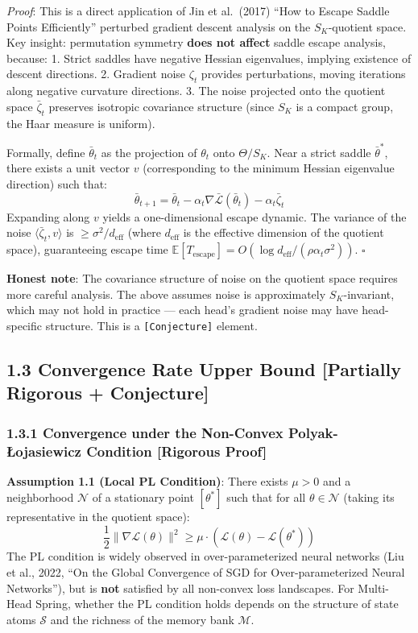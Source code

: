 \documentclass[
  12pt,
]{article}
\begin{document}
\emph{Proof}: This is a direct application of Jin et al.~(2017) ``How to Escape Saddle Points Efficiently'' perturbed gradient descent analysis on the $S_K$-quotient space. Key insight: permutation symmetry \textbf{does not affect} saddle escape analysis, because:
1. Strict saddles have negative Hessian eigenvalues, implying existence of descent directions.
2. Gradient noise $\zeta_t$ provides perturbations, moving iterations along negative curvature directions.
3. The noise projected onto the quotient space $\bar{\zeta}_t$ preserves isotropic covariance structure (since $S_K$ is a compact group, the Haar measure is uniform).

Formally, define $\bar{\theta}_t$ as the projection of $\theta_t$ onto $\Theta/S_K$. Near a strict saddle $\bar{\theta}^*$, there exists a unit vector $v$ (corresponding to the minimum Hessian eigenvalue direction) such that:
\[\bar{\theta}_{t+1} = \bar{\theta}_t - \alpha_t \nabla\bar{\mathcal{L}}(\bar{\theta}_t) - \alpha_t \bar{\zeta}_t\]
Expanding along $v$ yields a one-dimensional escape dynamic. The variance of the noise $\langle \bar{\zeta}_t, v \rangle$ is $\geq \sigma^2/d_{\text{eff}}$ (where $d_{\text{eff}}$ is the effective dimension of the quotient space), guaranteeing escape time $\mathbb{E}[T_{\text{escape}}] = O(\log d_{\text{eff}} / (\rho \alpha_t \sigma^2))$. $\square$

\textbf{Honest note}: The covariance structure of noise on the quotient space requires more careful analysis. The above assumes noise is approximately $S_K$-invariant, which may not hold in practice --- each head's gradient noise may have head-specific structure. This is a \texttt{[Conjecture]} element.

\subsection{1.3 Convergence Rate Upper Bound [Partially Rigorous + Conjecture]}\label{convergence-rate-upper-bound}

\subsubsection{1.3.1 Convergence under the Non-Convex Polyak-\L ojasiewicz Condition [Rigorous Proof]}\label{convergence-under-pl}

\textbf{Assumption 1.1 (Local PL Condition)}: There exists $\mu > 0$ and a neighborhood $\mathcal{N}$ of a stationary point $[\theta^*]$ such that for all $\theta \in \mathcal{N}$ (taking its representative in the quotient space):
\[\frac{1}{2}\|\nabla\mathcal{L}(\theta)\|^2 \geq \mu \cdot (\mathcal{L}(\theta) - \mathcal{L}(\theta^*))\]
The PL condition is widely observed in over-parameterized neural networks (Liu et al., 2022, ``On the Global Convergence of SGD for Over-parameterized Neural Networks''), but is \textbf{not} satisfied by all non-convex loss landscapes. For Multi-Head Spring, whether the PL condition holds depends on the structure of state atoms $\mathcal{S}$ and the richness of the memory bank $\mathcal{M}$.
\end{document}
